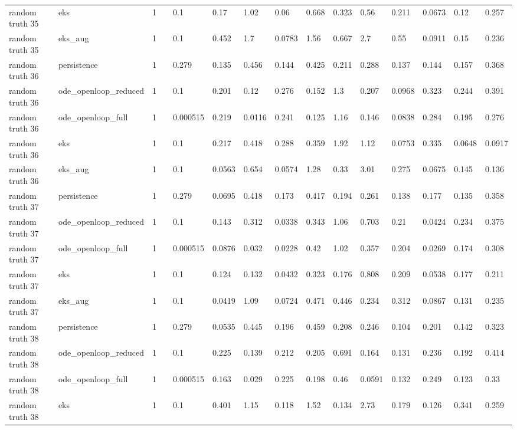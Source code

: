 \begin{table}[t]
\begin{tabular}{lllllllllllllll}
random truth 35 & eks & 1 &  & 0.1 & 0.17 & 1.02 & 0.06 & 0.668 & 0.323 & 0.56 & 0.211 & 0.0673 & 0.12 & 0.257 \\
random truth 35 & eks\_aug & 1 &  & 0.1 & 0.452 & 1.7 & 0.0783 & 1.56 & 0.667 & 2.7 & 0.55 & 0.0911 & 0.15 & 0.236 \\
random truth 36 & persistence & 1 &  & 0.279 & 0.135 & 0.456 & 0.144 & 0.425 & 0.211 & 0.288 & 0.137 & 0.144 & 0.157 & 0.368 \\
random truth 36 & ode\_openloop\_reduced & 1 &  & 0.1 & 0.201 & 0.12 & 0.276 & 0.152 & 1.3 & 0.207 & 0.0968 & 0.323 & 0.244 & 0.391 \\
random truth 36 & ode\_openloop\_full & 1 &  & 0.000515 & 0.219 & 0.0116 & 0.241 & 0.125 & 1.16 & 0.146 & 0.0838 & 0.284 & 0.195 & 0.276 \\
random truth 36 & eks & 1 &  & 0.1 & 0.217 & 0.418 & 0.288 & 0.359 & 1.92 & 1.12 & 0.0753 & 0.335 & 0.0648 & 0.0917 \\
random truth 36 & eks\_aug & 1 &  & 0.1 & 0.0563 & 0.654 & 0.0574 & 1.28 & 0.33 & 3.01 & 0.275 & 0.0675 & 0.145 & 0.136 \\
random truth 37 & persistence & 1 &  & 0.279 & 0.0695 & 0.418 & 0.173 & 0.417 & 0.194 & 0.261 & 0.138 & 0.177 & 0.135 & 0.358 \\
random truth 37 & ode\_openloop\_reduced & 1 &  & 0.1 & 0.143 & 0.312 & 0.0338 & 0.343 & 1.06 & 0.703 & 0.21 & 0.0424 & 0.234 & 0.375 \\
random truth 37 & ode\_openloop\_full & 1 &  & 0.000515 & 0.0876 & 0.032 & 0.0228 & 0.42 & 1.02 & 0.357 & 0.204 & 0.0269 & 0.174 & 0.308 \\
random truth 37 & eks & 1 &  & 0.1 & 0.124 & 0.132 & 0.0432 & 0.323 & 0.176 & 0.808 & 0.209 & 0.0538 & 0.177 & 0.211 \\
random truth 37 & eks\_aug & 1 &  & 0.1 & 0.0419 & 1.09 & 0.0724 & 0.471 & 0.446 & 0.234 & 0.312 & 0.0867 & 0.131 & 0.235 \\
random truth 38 & persistence & 1 &  & 0.279 & 0.0535 & 0.445 & 0.196 & 0.459 & 0.208 & 0.246 & 0.104 & 0.201 & 0.142 & 0.323 \\
random truth 38 & ode\_openloop\_reduced & 1 &  & 0.1 & 0.225 & 0.139 & 0.212 & 0.205 & 0.691 & 0.164 & 0.131 & 0.236 & 0.192 & 0.414 \\
random truth 38 & ode\_openloop\_full & 1 &  & 0.000515 & 0.163 & 0.029 & 0.225 & 0.198 & 0.46 & 0.0591 & 0.132 & 0.249 & 0.123 & 0.33 \\
random truth 38 & eks & 1 &  & 0.1 & 0.401 & 1.15 & 0.118 & 1.52 & 0.134 & 2.73 & 0.179 & 0.126 & 0.341 & 0.259 \\

\end{tabular}
\end{table}
